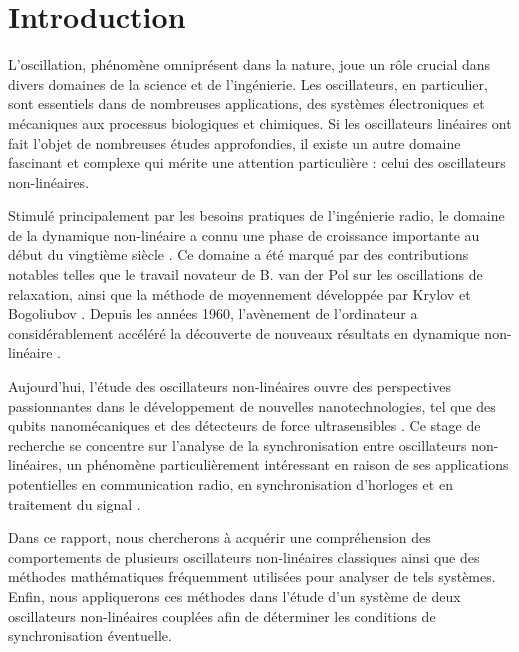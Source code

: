 \chapter{Introduction}
L'oscillation, phénomène omniprésent dans la nature, joue un rôle crucial dans divers domaines de la science et de l'ingénierie. Les oscillateurs, en particulier, sont essentiels dans de nombreuses applications, des systèmes électroniques et mécaniques aux processus biologiques et chimiques. Si les oscillateurs linéaires ont fait l'objet de nombreuses études approfondies, il existe un autre domaine fascinant et complexe qui mérite une attention particulière : celui des oscillateurs non-linéaires.

Stimulé principalement par les besoins pratiques de l'ingénierie radio,
le domaine de la dynamique non-linéaire a connu une phase de croissance importante au début du vingtième siècle \cite{samoilenko_nn_1994}.
Ce domaine a été marqué par des contributions notables telles que le travail novateur de B. van der Pol sur les oscillations de relaxation, ainsi que la méthode de moyennement développée par Krylov et Bogoliubov \cite{mira_historical_1997}. Depuis les années 1960, l'avènement de l'ordinateur a considérablement accéléré la découverte de nouveaux résultats en dynamique non-linéaire \cite{mira_historical_1997}.

Aujourd'hui, l'étude des oscillateurs non-linéaires ouvre des perspectives passionnantes dans le développement de nouvelles nanotechnologies, tel que des qubits nanomécaniques \cite{pistolesi_proposal_2021} et des détecteurs de force ultrasensibles \cite{moser_ultrasensitive_2013}. Ce stage de recherche se concentre sur l'analyse de la synchronisation entre oscillateurs non-linéaires, un phénomène particulièrement intéressant en raison de ses applications potentielles en communication radio, en synchronisation d'horloges et en traitement du signal \cite{djorwe_self-organized_2020}.

Dans ce rapport, nous chercherons à acquérir une compréhension des 
comportements de plusieurs oscillateurs non-linéaires classiques ainsi que 
des méthodes mathématiques fréquemment utilisées pour analyser de tels systèmes. 
Enfin, nous appliquerons ces méthodes dans l'étude d'un système 
de deux oscillateurs non-linéaires couplées afin de déterminer les conditions de synchronisation éventuelle.



